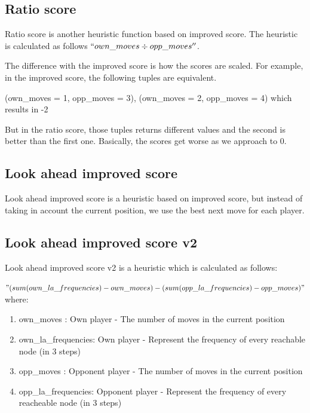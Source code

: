 \documentclass[10pt,a4paper]{article}
\begin{document}
\subsection{Ratio score}
Ratio score is another heuristic function based on improved score. The heuristic is calculated as follows $``own\_moves \div opp\_moves''$.\newline

The difference with the improved score is how the scores are scaled. For example, in the improved score, the following tuples are equivalent.\newline

(own\_moves = 1, opp\_moves = 3), (own\_moves = 2, opp\_moves = 4) which results in -2\newline

But in the ratio score, those tuples returns different values and the second is better than the first one. Basically, the scores get worse as we approach to 0.

\subsection{Look ahead improved score}
Look ahead improved score is a heuristic based on improved score, but instead of taking in account the current position, we use the best next move for each player.

\subsection{Look ahead improved score v2}
Look ahead improved score v2 is a heuristic which is calculated as follows:

$" (sum(own\_la\_frequencies) - own\_moves) - (sum(opp\_la\_frequencies) - opp\_moves)"$  where:

\begin{enumerate}
\item own\_moves : Own player - The number of moves in the current position
\item own\_la\_frequencies: Own player -  Represent the frequency of every reachable node (in 3 steps) 

\item opp\_moves : Opponent player - The number of moves in the current position
\item opp\_la\_frequencies: Opponent player -  Represent the frequency of every reacheable node (in 3 steps) 

\end{enumerate}
\end{document}

